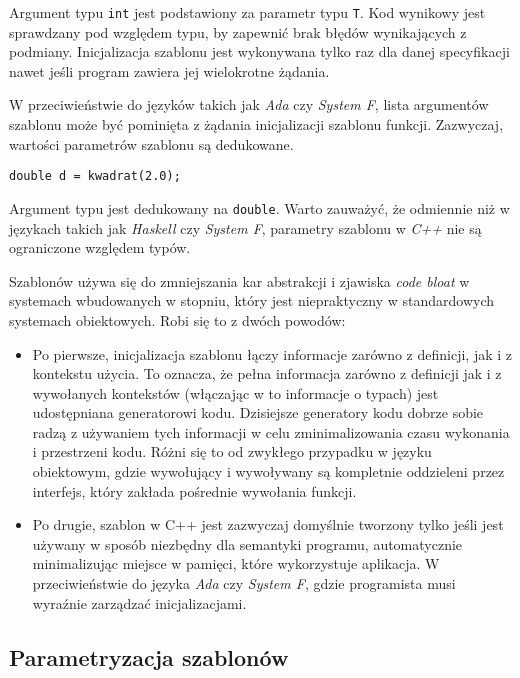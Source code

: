\documentclass[11pt, a4paper]{article}
\begin{document}
Argument typu \verb#int# jest podstawiony za parametr typu \verb#T#. Kod wynikowy jest sprawdzany pod względem typu, by zapewnić brak błędów wynikających z podmiany. Inicjalizacja szablonu jest wykonywana tylko raz dla danej specyfikacji nawet jeśli program zawiera jej wielokrotne żądania. 

W przeciwieństwie do języków takich jak \emph{Ada} czy \emph{System F}, lista argumentów szablonu może być pominięta z żądania inicjalizacji szablonu funkcji. Zazwyczaj, wartości parametrów szablonu są dedukowane.
\newline

\verb#double d = kwadrat(2.0);# \newline

Argument typu jest dedukowany na \verb#double#. Warto zauważyć, że odmiennie niż w językach takich jak \emph{Haskell} czy \emph{System F}, parametry szablonu w \emph{C++} nie są ograniczone względem typów.

Szablonów używa się do zmniejszania kar abstrakcji i zjawiska \emph{code bloat} w systemach wbudowanych w stopniu, który jest niepraktyczny w standardowych systemach obiektowych. Robi się to z dwóch powodów:

\begin{itemize}

\item Po pierwsze, inicjalizacja szablonu łączy informacje zarówno z definicji, jak i z kontekstu użycia. To oznacza, że pełna informacja zarówno z definicji jak i z wywołanych kontekstów (włączając w to informacje o typach) jest udostępniana generatorowi kodu. Dzisiejsze generatory kodu dobrze sobie radzą z używaniem tych informacji w celu zminimalizowania czasu wykonania i przestrzeni kodu. Różni się to od zwykłego przypadku w języku obiektowym, gdzie wywołujący i wywoływany są kompletnie oddzieleni przez interfejs, który zakłada pośrednie wywołania funkcji.

\item Po drugie, szablon w C++ jest zazwyczaj domyślnie tworzony tylko jeśli jest używany w sposób niezbędny dla semantyki programu, automatycznie minimalizując miejsce w pamięci, które wykorzystuje aplikacja. W przeciwieństwie do języka \emph{Ada} czy \emph{System F}, gdzie programista musi wyraźnie zarządzać inicjalizacjami.

\end{itemize}

\subsection{Parametryzacja szablonów}
\end{document}
